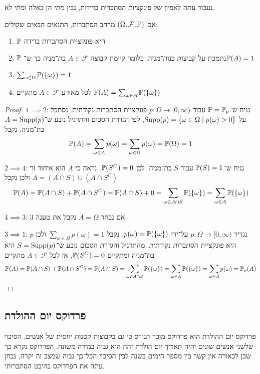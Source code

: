 נעבור עתה לאפיון של פונקציות הסתברות בדידות, נבין מתי הן כאלה ומתי לא.
\begin{theorem}
	אם $(\Omega, \mathcal{F}, \mathbb{P})$ מרחב הסתברות, התנאים הבאים שקולים:
	\begin{enumerate}
		\item $\mathbb{P}$ היא פונקציית הסתברות בדידה
		\item $\mathbb{P}$ נתמכת על קבוצות בנות־מניה, כלומר קיימת קבוצה $A \in \mathcal{F}$ בת־מניה כך ש־$\mathbb{P}(A) = 1$
		\item $\sum_{\omega \in \Omega} \mathbb{P}(\{\omega\}) = 1$
		\item לכל מאורע $A \in \mathcal{F}$ מתקיים $\mathbb{P}(A) = \sum_{\omega \in A} \mathbb{P}(\{\omega\})$
	\end{enumerate}
\end{theorem}
\begin{proof}
	$1 \implies 2$:
	נניח ש־$\mathbb{P} = \mathbb{P}_p$ עבור $p : \Omega \to [0, \infty)$ פונקציית הסתברות נקודתית.
	נסתכל על $\operatorname{Supp}(p) = \{ \omega \in \Omega \mid p(\omega) > 0 \}$, לפי הגדרת הסכום והתרגיל נובע ש־$A = \operatorname{Supp}(p)$ בת־מניה.
	נקבל
	\[
		\mathbb{P}(A) = \sum_{\omega \in A} p(\omega) = \sum_{\omega \in \Omega} p(\omega) = \mathbb{P}(\Omega) = 1
	\]

	$2 \implies 4$:
	נניח ש־$\mathbb{P}(S) = 1$ עבור $S$ בת־מניה. לכן $\mathbb{P}(S^C) = 0$.
	נראה כי $A$ הוא איחוד זר $A = (A \cap S) \cup (A \cap S^C)$ ולכן נקבל
	\[
		\mathbb{P}(A) = \mathbb{P}(A \cap S) + \mathbb{P}(A \cap S^C) = \mathbb{P}(A \cap S) + 0 = \sum_{\omega \in A \cap S} \mathbb{P}(\{\omega\}) = \sum_{\omega \in A} \mathbb{P}(\{\omega\})
	\]

	$4 \implies 3$:
	אם נבחר $A = \Omega$ נקבל את טענה 3.

	$3 \implies 1$:
	נגדיר $p : \Omega \to [0, \infty)$ על־ידי $p(\omega) = \mathbb{P}(\{ \omega \})$, נקבל $\sum_{\omega \in \Omega} p(\omega) = 1$ ולכן $p$ היא פונקציית הסתברות נקודתית.
	מהתרגיל והגדרת הסכום נובע ש־$S = \operatorname{Supp}(p)$ היא בת־מניה ומתקיים $\mathbb{P}(S^C) = 0$, אז לכל $A \in \mathcal{F}$ מתקיים
	\[
		\mathbb{P}(A) = \mathbb{P}(A \cap S) + \mathbb{P}(A \cap S^C) = \mathbb{P}(A \cap S) = \sum_{\omega \in A \cap S} \mathbb{P}(\{ \omega \}) = \sum_{\omega \in A} \mathbb{P}(\{\omega\}) = \sum_{\omega \in A} p(\omega) = \mathbb{P}_p(A)
	\]
\end{proof}

\subsection{פרדוקס יום ההולדת}
פרדוקס יום ההולדת הוא פרדוקס מוכר הגורס כי גם בקבוצות קטנות יחסית של אנשים, הסיכוי שלשני אנשים שונים יהיה תאריך יום הולדת זהה הוא גבוה במידה משונה.
הפרדוקס נקרא כך שכן לכאורה אין קשר בין מספר הימים בשנה לבין הסיכוי הכל־כך גבוה שמצב זה יקרה, נבחן עתה את הפרדוקס בהיבט הסתברותי.

